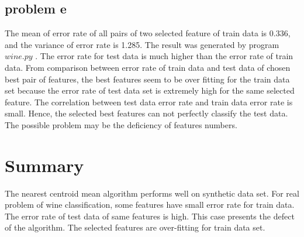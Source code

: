 \documentclass{article}
\begin{document}
	\subsection{problem e}
	The mean of error rate of all pairs of two selected feature of train data is 0.336, and the variance of error rate is 1.285.  The result was generated by program $wine.py$ . The error rate for test data is much higher than the error rate of train data. 
	From comparison between error rate of train data and test data of chosen best pair of features, the best features seem to be over fitting for the train data set because the error rate of test data set is extremely high for the same selected feature. The correlation between test data error rate and train data error rate is small. Hence, the selected best features  can not perfectly classify the test data. The possible problem may be the deficiency of features numbers. 
	\section{Summary}
	The nearest centroid mean algorithm performs well on synthetic data set. For real problem of wine classification, some features have small error rate for train data. The error rate of test data of same features is high. This case presents the defect of the algorithm. The selected features are over-fitting for train data set. 
\end{document}
